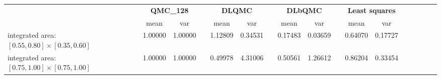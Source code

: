 \begin{tabular}{lcccccccccccccccc}
\toprule
 &\multicolumn{2}{c}{\textbf{QMC\_128}}&&\multicolumn{2}{c}{\textbf{DLQMC}}&&\multicolumn{2}{c}{\textbf{DLbQMC}}&&\multicolumn{2}{c}{\textbf{Least squares}}\\ 
\cmidrule(r){2-3} \cmidrule(r){5-6} \cmidrule(r){8-9}
 &mean&var&&mean&var&&mean&var&&mean&var\\ 
\midrule
integrated area: $[0.55,0.80]\times [0.35,0.60]$ &1.00000&1.00000&&1.12809&0.34531&&0.17483&0.03659&&0.64070&0.17727\\ 
integrated area: $[0.75,1.00]\times [0.75,1.00]$ &1.00000&1.00000&&0.49978&4.31006&&0.50561&1.26612&&0.86204&0.33454\\ 
\bottomrule
\end{tabular}

